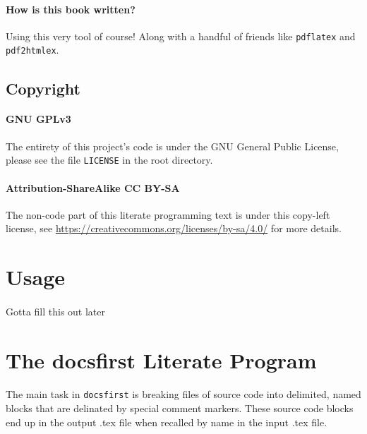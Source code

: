 \documentclass{article}
\begin{document}
\paragraph{How is this book written?} Using this very tool of course! Along with
a handful of friends like \texttt{pdflatex} and \texttt{pdf2htmlex}.

\subsection{Copyright}

\paragraph{GNU GPLv3} The entirety of this project's code is under the GNU
General Public License, please see the file \texttt{LICENSE} in the root
directory.


\paragraph{Attribution-ShareAlike CC BY-SA} The non-code part of this
literate programming text is under this copy-left license, see
\url{https://creativecommons.org/licenses/by-sa/4.0/} for more details.

\section{Usage}

\paragraph{} Gotta fill this out later

\section{The docsfirst Literate Program}

\paragraph{}
The main task in \texttt{docsfirst} is breaking files of source code into delimited,
named blocks that are delinated by special comment markers. These source code
blocks end up in the output .tex file when recalled by name in the input .tex
file.

\end{document}
